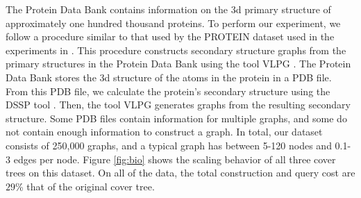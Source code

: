 \documentclass[../main.tex]{subfiles}
\begin{document}
The Protein Data Bank \cite{Berman2000} contains information on the 3d primary structure of approximately one hundred thousand proteins.
To perform our experiment, we follow a procedure similar to that used by the PROTEIN dataset used in the experiments in \citet{Vishwanathan2010}.
This procedure constructs secondary structure graphs from the primary structures in the Protein Data Bank
using the tool VLPG \citep{Schfer2012}.
The Protein Data Bank stores the 3d structure of the atoms in the protein in a PDB file.
From this PDB file, we calculate the protein's secondary structure using the DSSP tool \citep{Joosten11}.
Then, the tool VLPG \citep{Schfer2012} generates graphs from the resulting secondary structure.
Some PDB files contain information for multiple graphs, and some do not contain enough information to construct a graph.
In total, our dataset consists of 250,000 graphs, and a typical graph has between 5-120 nodes and 0.1-3 edges per node.
Figure \ref{fig:bio} shows the scaling behavior of all three cover trees on this dataset.
On all of the data, the total construction and query cost are $29$\% that of the original cover tree.
\end{document}

